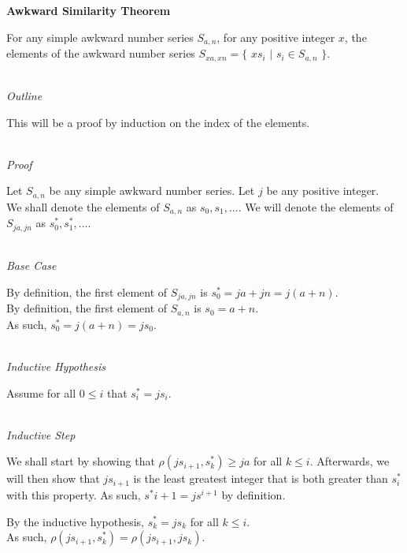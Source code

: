 \documentclass[a4paper,12pt]{article}
\begin{document}
\label{theorem:similar_theorem}
\hypertarget{theorem:similar_theorem}{}
\begin{tcolorbox}
\textbf{Awkward Similarity Theorem}

\noindent For any simple awkward number series $S_{a, n}$, for any positive integer $x$, the elements of the awkward number series $S_{xa, xn} = \{$ $xs_i$ $|$ $s_i \in S_{a,n}$ $\}$.
\end{tcolorbox}

\noindent \\
\textit{Outline}

\noindent This will be a proof by induction on the index of the elements.

\noindent \\
\textit{Proof}

\noindent Let $S_{a,n}$ be any simple awkward number series. Let $j$ be any positive integer.\\

\noindent We shall denote the elements of $S_{a,n}$ as $s_0, s_1, ...$. We will denote the elements of $S_{ja, jn}$ as $s^*_0, s^*_1, ...$.

\noindent \\
\textit{Base Case}

\noindent By definition, the first element of $S_{ja, jn}$ is $s^*_0 = ja + jn = j(a + n)$.\\

\noindent By definition, the first element of $S_{a,n}$ is $s_0 = a + n$.\\

\noindent As such, $s^*_0 = j(a + n) = js_0$.



\noindent \\
\textit{Inductive Hypothesis}

\noindent Assume for all $0 \leq i$ that $s^*_i = js_i$.


\noindent \\
\textit{Inductive Step}

\noindent We shall start by showing that $\rho(js_{i+1}, s^*_k) \geq ja$ for all $k \leq i$. Afterwards, we will then show that $js_{i+1}$ is the least greatest integer that is both greater than $s^*_i$ with this property. As such, $s^*{i+1} = js^{i+1}$ by definition.

\noindent By the inductive hypothesis, $s^*_k = js_k$ for all $k \leq i$.\\

\noindent As such, $\rho(js_{i+1}, s^*_k) = \rho(js_{i+1}, js_k)$.\\
\end{document}
